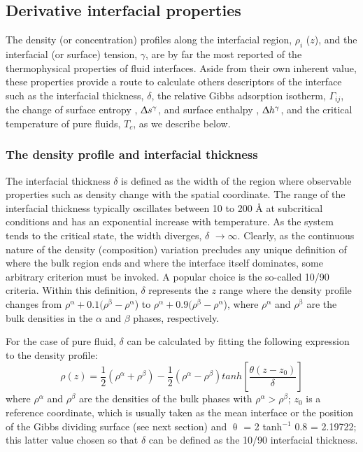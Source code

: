 \documentclass[9pt,tutorial]{livecoms}
\begin{document}
\subsection{Derivative interfacial properties}

The density (or concentration) profiles along the interfacial region,
${\rho}_{i}$ ($z$), and the interfacial (or surface) tension,
{${\gamma}$}, are by far the most reported of the thermophysical properties of
fluid interfaces. Aside from their own inherent value, these properties provide
a route to calculate others descriptors of the interface such as the
interfacial thickness, {${\delta}$}, the relative Gibbs adsorption isotherm,
${\Gamma}_{ij}$, the change of surface entropy
, ${\Updelta}s^{{\gamma}}$, and surface enthalpy
, ${\Updelta}h^{{\gamma}}$, and the critical temperature of pure
fluids, $T_{c}$, as we describe below. 

\subsubsection{The density profile and interfacial thickness}

The interfacial thickness $\delta$ is defined as the width of the region where observable properties such as
density change with the spatial coordinate. The range of the interfacial
thickness typically oscillates between 10 to 200 \AA{} at subcritical conditions and has
an exponential increase with temperature. As the system tends to the critical
state, the width diverges, {${\delta}$} ${\rightarrow}{\infty}$. Clearly, as
the continuous nature of the density (composition) variation precludes any
unique definition of where the bulk region ends and where the interface itself
dominates, some arbitrary criterion must be invoked. A popular choice is the so-called
10/90 criteria. Within this definition, {${\delta}$} represents the
$z$ range where the density profile changes from
${\rho}^{\mathrm{{\upalpha}}} + 0.1({\rho}^{\mathrm{{\upbeta}}}
- {\rho}^{\mathrm{{\upalpha}}}$) to
${\rho}^{\mathrm{{\upalpha}}} + 0.9 ({\rho}^{\mathrm{{\upbeta}}}
- {\rho}^{\mathrm{{\upalpha}}}$), where
${\rho}^{\mathrm{{\upalpha}}}$ and ${\rho}^{\mathrm{{\upbeta}}}$ are the bulk
densities in the {${\alpha}$} and {${\beta}$} phases, respectively.

For the case of pure fluid, {${\delta}$} can be calculated by fitting the following expression to the density profile\citep{evans1992,rowlinson1982}:
\begin{equation}
\rho\left(z\right)=\frac{1}{2}\left(\rho^{\alpha}+\rho^{\beta}\right)-\frac{1}{2}\left(\rho^{\alpha}-\rho^{\beta}\right)tanh\left[\frac{\theta\left(z-z_{0}\right)}{\delta}\right]
  \label{eq:3}
\end{equation}
where $\rho^\alpha$ and $\rho^\beta$ are the densities of the bulk phases with 
$\rho^\alpha > \rho^\beta$; $z_{0}$ is a reference coordinate, which is usually taken as the
mean interface or the position of the Gibbs dividing surface (see next
section) and {${\uptheta}$} = 2 tanh$^{-1}$ 0.8 = 2.19722; this latter value
chosen so that {${\delta}$} can be defined as the 10/90 interfacial thickness.
\end{document}
